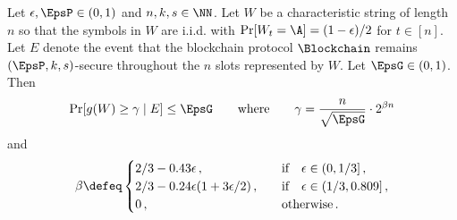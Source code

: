 
\begin{theorem}\label{thm:praos-tail-gamma}
  Let $\epsilon, \EpsP \in (0, 1)$ and $n, k, s \in \NN$. 
  Let $W$ be a characteristic string of length $n$ so that 
  the symbols in $W$ are i.i.d. 
  with $\Pr[W_t = \A] = (1 - \epsilon)/2$ for $t \in [n]$. 
  Let $E$ denote the event that 
  the blockchain protocol $\Blockchain$ 
  remains $(\EpsP, k, s)$-secure throughout 
  the $n$ slots represented by $W$. 
  Let $\EpsG \in (0, 1)$.
  Then 
  \[
      \Pr[g(W) \geq \gamma \mid E] \leq \EpsG 
      \qquad\text{where}\qquad
      \gamma = \frac{n}{\sqrt{\EpsG}}\cdot 2^{\beta n}
  \]
  and 
  \[
      \beta \defeq \begin{cases}
          2/3 - 0.43 \epsilon
              \,, &\quad\text{if}\quad\epsilon \in (0, 1/3]\,, \\
          2/3 - 0.24 \epsilon (1 + 3\epsilon/2)
              \,, &\quad\text{if}\quad\epsilon \in (1/3,0.809]\,, \\
          0
              \,,&\quad\text{otherwise}\,.
      \end{cases}
  \]
\end{theorem}

